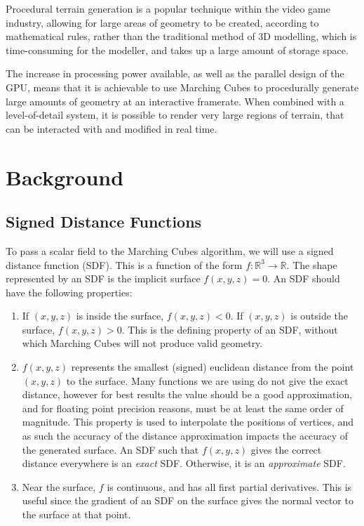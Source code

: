 \documentclass[11pt]{article}
\begin{document}
Procedural terrain generation is a popular technique within the video game industry, allowing for large areas of geometry to be created, according to mathematical rules, rather than the traditional method of 3D modelling, which is time-consuming for the modeller, and takes up a large amount of storage space.

The increase in processing power available, as well as the parallel design of the GPU, means that it is achievable to use Marching Cubes to procedurally generate large amounts of geometry at an interactive framerate. When combined with a level-of-detail system, it is possible to render very large regions of terrain, that can be interacted with and modified in real time.

\section{Background}
\subsection{Signed Distance Functions} 
\label{section:sdf}
To pass a scalar field to the Marching Cubes algorithm, we will use a signed distance function (SDF). This is a function of the form $f:\mathbb{R}^3 \rightarrow \mathbb{R}$. The shape represented by an SDF is the implicit surface $f\left(x,y,z\right) = 0$. An SDF should have the following properties:
\begin{enumerate}[label=\roman*.]
\item If $\left(x,y,z\right)$ is inside the surface, $f\left(x,y,z\right) < 0$. If $\left(x,y,z\right)$ is outside the surface, $f\left(x,y,z\right) > 0$. This is the defining property of an SDF, without which Marching Cubes will not produce valid geometry.
\item $f\left(x,y,z\right)$ represents the smallest (signed) euclidean distance from the point $\left(x,y,z\right)$ to the surface. Many functions we are using do not give the exact distance, however for best results the value should be a good approximation, and for floating point precision reasons, must be at least the same order of magnitude. This property is used to interpolate the positions of vertices, and as such the accuracy of the distance approximation impacts the accuracy of the generated surface. An SDF such that $f\left(x,y,z\right)$ gives the correct distance everywhere is an \textit{exact} SDF. Otherwise, it is an \textit{approximate} SDF.
\item Near the surface, $f$ is continuous, and has all first partial derivatives. This is useful since the gradient of an SDF on the surface gives the normal vector to the surface at that point.
\end{enumerate}
\end{document}

